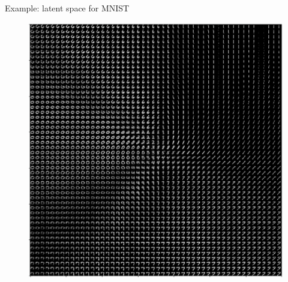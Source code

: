 \documentclass[xcolor=pdftex,dvipsnames,table,mathserif]{beamer}
\begin{document}
\begin{frame}{Example: latent space for MNIST}
\begin{figure}
\includegraphics[height=0.9\textheight]{../graphics/LatentMNIST}
\end{figure}
\end{frame}






\end{document}
